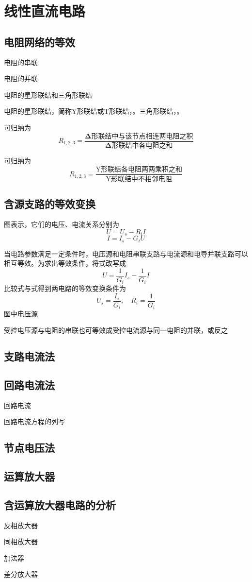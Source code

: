 \chapter{线性直流电路}

\section{电阻网络的等效}
电阻的串联

电阻的并联

电阻的星形联结和三角形联结

电阻的星形联结，简称$\mathrm{Y}$形联结或$\mathrm{T}$形联结，。三角形联结，。

可归纳为
\[
R_{1,2,3}=\frac{\boldsymbol{\Delta}\text{形联结中与该节点相连两电阻之积}}{\boldsymbol{\Delta}\text{形联结中各电阻之和}}
\]

可归纳为
\[
R_{1,2,3}=\frac{\mathrm{Y}\text{形联结各电阻两两乘积之和}}{\mathrm{Y}\text{形联结中不相邻电阻}}
\]

\section{含源支路的等效变换}
图表示，它们的电压、电流关系分别为
\[
U=U_s-R_iI
\]
\[
I=I_s-G_iU
\]

当电路参数满足一定条件时，电压源和电阻串联支路与电流源和电导并联支路可以相互等效。为求出等效条件，将式改写成
\[
U=\frac{1}{G_i}I_s-\frac{1}{G_i}I
\]
比较式与式得到两电路的等效变换条件为
\[
U_s=\frac{I_s}{G_i},\quad R_i=\frac{1}{G_i}
\]
图中电压源

受控电压源与电阻的串联也可等效成受控电流源与同一电阻的并联，或反之

\section{支路电流法}

\section{回路电流法}
回路电流

回路电流方程的列写

\section{节点电压法}

\section{运算放大器}

\section{含运算放大器电路的分析}
反相放大器

同相放大器

加法器

差分放大器